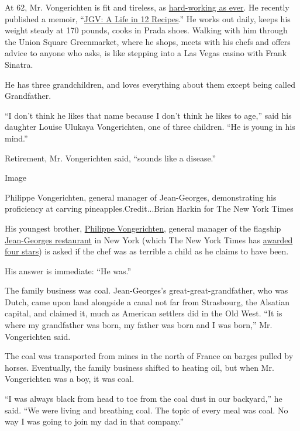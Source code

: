 At 62, Mr. Vongerichten is fit and tireless, as
\href{https://www.nytimes.com/2019/10/17/magazine/jean-georges-restaurants.html}{hard-working
as ever}. He recently published a memoir,
``\href{https://wwnorton.com/books/9780393608489}{JGV: A Life in 12
Recipes}.'' He works out daily, keeps his weight steady at 170 pounds,
cooks in Prada shoes. Walking with him through the Union Square
Greenmarket, where he shops, meets with his chefs and offers advice to
anyone who asks, is like stepping into a Las Vegas casino with Frank
Sinatra.

He has three grandchildren, and loves everything about them except being
called Grandfather.

``I don't think he likes that name because I don't think he likes to
age,'' said his daughter Louise Ulukaya Vongerichten, one of three
children. ``He is young in his mind.''

Retirement, Mr. Vongerichten said, ``sounds like a disease.''

Image

Philippe Vongerichten, general manager of Jean-Georges, demonstrating
his proficiency at carving pineapples.Credit...Brian Harkin for The New
York Times

His youngest brother,
\href{https://ny.eater.com/2011/7/15/6669497/philippe-vongerichten-looks-back-on-14-years-of-jean-georges}{Philippe
Vongerichten}, general manager of the flagship
\href{https://www.jean-georgesrestaurant.com/jean-georges/}{Jean-Georges
restaurant} in New York (which The New York Times has
\href{https://www.nytimes.com/2014/04/09/dining/restaurant-review-jean-georges-on-the-upper-west-side.html}{awarded
four stars}) is asked if the chef was as terrible a child as he claims
to have been.

His answer is immediate: ``He was.''

The family business was coal. Jean-Georges's great-great-grandfather,
who was Dutch, came upon land alongside a canal not far from Strasbourg,
the Alsatian capital, and claimed it, much as American settlers did in
the Old West. ``It is where my grandfather was born, my father was born
and I was born,'' Mr. Vongerichten said.

The coal was transported from mines in the north of France on barges
pulled by horses. Eventually, the family business shifted to heating
oil, but when Mr. Vongerichten was a boy, it was coal.

``I was always black from head to toe from the coal dust in our
backyard,'' he said. ``We were living and breathing coal. The topic of
every meal was coal. No way I was going to join my dad in that
company.''

